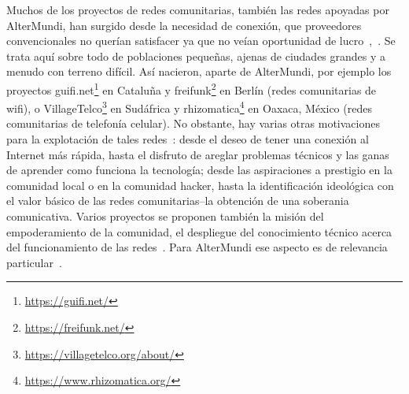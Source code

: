 \begin{comment}
características:
* infraestructura de comunicación decentralizada, creada y mantenida por la comunidad de lxs usuarixs (el estado/empresas grandes no pueden cerrarla tan facilmente) --> interesante sobre todo también para contextos autócratos (regimenes políticos antidemocráticos, vease Iran, China, Cuba, .. )
* garantizar acceso libre a información
* garantizar la libertad de expresión
* ..
* el firmware: software libre

\item infraestructura de comunicación abierta, accesible para tod@s
\item infraestructura creada y mantenida por la comunidad de l@s usuari@s

  \begin{itemize}
    \item conectar a comunidades excluidas por los proveedores convencionales de servicios Internet
    \item garantizar acceso libre a información
    \item garantizar la libertad de expreción
  \end{itemize}
\end{comment}

Muchos de los proyectos de redes comunitarias, también las redes apoyadas por AlterMundi, han surgido desde la necesidad de conexión, que proveedores convencionales no querían satisfacer ya que no veían oportunidad de lucro~\autocite{Piccoli2015},~\autocite{Vaseva2016a}.
Se trata aquí sobre todo de poblaciones pequeñas, ajenas de ciudades grandes y a menudo con terreno difícil.
Así nacieron, aparte de AlterMundi, por ejemplo los proyectos guifi.net\footnote{\url{https://guifi.net/}} en Cataluña y freifunk\footnote{\url{https://freifunk.net/}} en Berlín (redes comunitarias de wifi), o VillageTelco\footnote{\url{https://villagetelco.org/about/}} en Sudáfrica y rhizomatica\footnote{\url{https://www.rhizomatica.org/}} en Oaxaca, México (redes comunitarias de telefonía celular).
No obstante, hay varias otras motivaciones para la explotación de tales redes~\autocite{Vaseva2016b}:
desde el deseo de tener una conexión al Internet más rápida, hasta el disfruto de areglar problemas técnicos y las ganas de aprender como funciona la tecnología;
desde las aspiraciones a prestigio en la comunidad local o en la comunidad hacker, hasta la identificación ideológica con el valor básico de las redes comunitarias--la obtención de una soberania comunicativa.
Varios proyectos se proponen también la misión del empoderamiento de la comunidad, el despliegue del conocimiento técnico acerca del funcionamiento de las redes~\autocite{Vaseva2016b}.
Para AlterMundi ese aspecto es de relevancia particular~\autocite{Vaseva2016a}.
